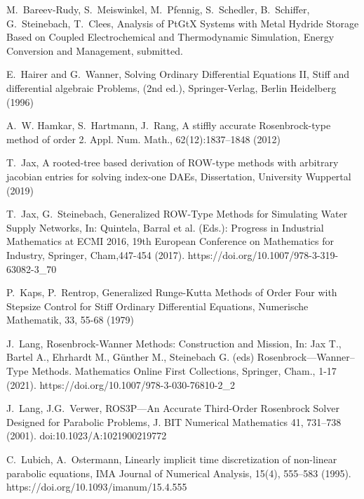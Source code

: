 \documentclass{juliacon}
\begin{document}
\begin{thebibliography}{}

M.~Bareev-Rudy, S.~Meiswinkel, M.~Pfennig, S.~Schedler, B.~Schiffer, G.~Steinebach, T.~Clees,
Analysis of PtGtX Systems with Metal Hydride Storage Based on Coupled Electrochemical and Thermodynamic Simulation,
Energy Conversion and Management, submitted.

 E.~Hairer and G.~Wanner, Solving Ordinary Differential Equations II, Stiff and differential algebraic Problems, 
(2nd ed.), Springer-Verlag, Berlin Heidelberg (1996) 

 A.~W. Hamkar, S.~Hartmann, J.~Rang, A stiffly accurate
Rosenbrock-type method of order 2. Appl. Num. Math., 62(12):1837–1848 (2012)

 T.~Jax, A rooted-tree based derivation of ROW-type methods with arbitrary jacobian entries for solving index-one DAEs, 
Dissertation, University Wuppertal (2019)

T.~Jax, G.~Steinebach,
Generalized ROW-Type Methods for Simulating Water Supply Networks,
In: Quintela, Barral et al. (Eds.): Progress in Industrial Mathematics at ECMI 2016, 19th European Conference on Mathematics for Industry, 
Springer, Cham,447-454 (2017). https://doi.org/10.1007/978-3-319-63082-3\_70 

 P.~Kaps, P.~Rentrop, Generalized Runge-Kutta Methods of Order Four with Stepsize Control for Stiff Ordinary Differential 
Equations, Numerische Mathematik, 33, 55-68 (1979)

 J.~Lang, Rosenbrock-Wanner Methods: Construction and Mission, 
In: Jax T., Bartel A., Ehrhardt M., Günther M., Steinebach G. (eds) Rosenbrock—Wanner–Type Methods. Mathematics Online First Collections,
Springer, Cham., 1-17 (2021). https://doi.org/10.1007/978-3-030-76810-2\_2 

 J.~Lang, J.G.~Verwer, ROS3P—An Accurate Third-Order Rosenbrock Solver Designed for Parabolic Problems, J. BIT Numerical Mathematics 41, 731–738 (2001). doi:10.1023/A:1021900219772

 C.~Lubich, A.~Ostermann, Linearly implicit time discretization of non-linear parabolic equations, 
IMA Journal of Numerical Analysis, 15(4), 555–583 (1995). https://doi.org/10.1093/imanum/15.4.555


\end{thebibliography}
\end{document}
